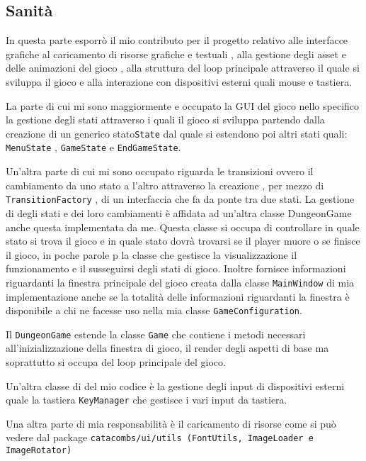 \documentclass[a4paper,12pt]{report}
\begin{document}
    \subsection{Sanità}
    \par In questa parte esporrò il mio contributo per il progetto relativo alle interfacce grafiche al caricamento di risorse grafiche
    e testuali , alla gestione degli asset e delle animazioni del gioco , alla struttura del loop principale attraverso il quale si
    sviluppa il gioco e alla interazione con dispositivi esterni quali mouse e tastiera.
    \par La parte di cui mi sono maggiormente e occupato la GUI del gioco nello specifico la gestione degli stati attraverso i quali
    il gioco si sviluppa partendo dalla creazione di un generico stato\texttt{State} dal quale si estendono poi altri stati quali:
    \texttt{MenuState} , \texttt{GameState} e \texttt{EndGameState}.
    \par Un’altra parte di cui mi sono occupato riguarda le transizioni ovvero il cambiamento da uno stato a l’altro attraverso la creazione
    , per mezzo di  \texttt{TransitionFactory} , di un interfaccia che fa da ponte tra due stati. La gestione di degli stati e dei loro
    cambiamenti è affidata ad un'altra classe DungeonGame anche questa implementata da me. Questa classe si occupa di controllare
    in quale stato si trova il gioco e in quale stato dovrà trovarsi se il player muore o se finisce il gioco, in poche parole p la
    classe che gestisce la visualizzazione il funzionamento e il susseguirsi degli stati di gioco. Inoltre fornisce informazioni
    riguardanti la finestra principale del gioco creata dalla classe \texttt{MainWindow} di mia implementazione anche se la totalità delle
    informazioni riguardanti la finestra è disponibile a chi  ne facesse uso nella mia classe \texttt{GameConfiguration}.
    \par Il \texttt{DungeonGame} estende la classe \texttt{Game} che contiene i metodi necessari all’inizializzazione della finestra di gioco,
    il render degli aspetti di base ma soprattutto si occupa del loop principale del gioco.
    \par Un’altra classe di del mio codice è la gestione degli input di dispositivi esterni quale la tastiera \texttt{KeyManager} che
    gestisce i vari input da tastiera.
    \par Una altra parte di mia responsabilità è il caricamento di risorse come si può vedere dal package \texttt{catacombs/ui/utils (FontUtils, ImageLoader e ImageRotator)}
\end{document}
